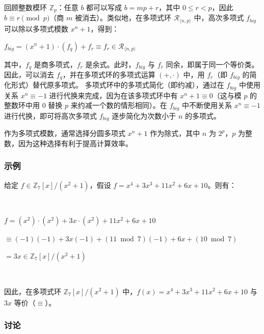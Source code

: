 回顾整数模环 $\mathbb{Z}_p$：任意 $b$ 都可以写成 $b = mp + r$，其中 $0\le r<p$，因此 $b \equiv r \pmod{p}$（商 $m$ 被消去）。类似地，在多项式环 $\mathcal{R}_{\langle n, p \rangle}$ 中，高次多项式 $f_{big}$ 可以除以多项式模数 $x^n + 1$，得到：

$f_{big} = (x^n + 1)\cdot(f_q) + f_r \equiv f_r \in \mathcal{R}_{\langle n, p \rangle}$

\noindent 其中，$f_q$ 是商多项式，$f_r$ 是余式。此时，$f_{big}$ 与 $f_r$ 同余，即属于同一个等价类。因此，可以消去 $f_q$，并在多项式环的多项式运算 $(+, \cdot)$ 中，用 $f_r$（即 $f_{big}$ 的简化形式）替代原多项式。
多项式环中的多项式简化（即约减），通过在 $f_{big}$ 中使用关系 $x^n \equiv -1$ 进行代换来完成，因为在该多项式环中有 $x^n + 1 \equiv 0$（这与模 $p$ 的整数环中用 $0$ 替换 $p$ 来约减一个数的情形相同）。在 $f_{big}$ 中不断使用关系 $x^n \equiv -1$ 进行代换，即可将高次多项式 $f_{big}$ 逐步简化为次数小于 $n$ 的多项式。

作为多项式模数，通常选择分圆多项式 $x^n + 1$ 作为除式，其中 $n$ 为 $2^p$，$p$ 为整数，因为这种选择有利于提高计算效率。

\subsubsection{示例}
\label{subsubsec:poly-ring-ex}
给定 $f \in \mathbb{Z}_7[x] / (x^2 + 1)$，假设 $f = x^4 + 3x^3 + 11x^2 + 6x + 10$。则有：

$ $

$f = (x^2)\cdot(x^2) + 3x\cdot(x^2) + 11x^2 + 6x + 10$ 

$ \equiv (-1)(-1) + 3x(-1) +  (11 \bmod 7)(-1) + 6x + (10 \bmod 7)$

$ = 3x \in \mathbb{Z}_7[x] / (x^2 + 1)$

$ $

\noindent 因此，在多项式环 $\mathbb{Z}_7[x] / (x^2 + 1)$ 中，$f(x) = x^4 + 3x^3 + 11x^2 + 6x + 10$ 与 $3x$ 等价（$\equiv$）。


\subsubsection{讨论}
\label{subsubsec:polynomial-ring-discuss}


